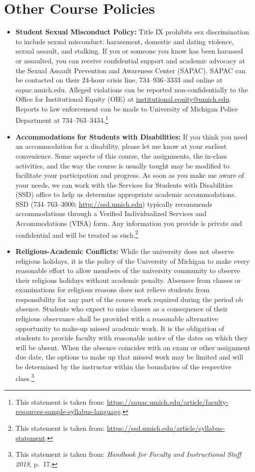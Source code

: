 \documentclass[11pt]{article}
\begin{document}
\section{Other Course Policies}
\begin{itemize}
 \item \textbf{Student Sexual Misconduct Policy:}
       Title IX prohibits sex discrimination to include sexual misconduct: harassment, domestic and dating violence, sexual assault, and stalking. If you or someone you know has been harassed or assaulted, you can receive confidential support and academic advocacy at the Sexual Assault Prevention and Awareness Center (SAPAC). SAPAC can be contacted on their 24-hour crisis line, 734--936--3333 and online at sapac.umich.edu. Alleged violations can be reported non-confidentially to the Office for Institutional Equity (OIE) at \href{mailto:institutional.equity@umich.edu}{institutional.equity@umich.edu}. Reports to law enforcement can be made to University of Michigan Police Department at 734--763--3434.\footnote{This statement is taken from: \url{https://sapac.umich.edu/article/faculty-resources-sample-syllabus-language}.}

 \item \textbf{Accommodations for Students with Disabilities:}
       If you think you need an accommodation for a disability, please let me know at your earliest convenience. Some aspects of this course, the assignments, the in-class activities, and the way the course is usually taught may be modified to facilitate your participation and progress. As soon as you make me aware of your needs, we can work with the Services for Students with Disabilities (SSD) office to help us determine appropriate academic accommodations. SSD (734--763--3000; \url{http://ssd.umich.edu}) typically recommends accommodations through a Verified Individualized Services and Accommodations (VISA) form. Any information you provide is private and confidential and will be treated as such.\footnote{This statement is taken from: \url{https://ssd.umich.edu/article/syllabus-statement}.}

 \item \textbf{Religious-Academic Conflicts:}
       While the university does not observe religious holidays, it is the policy of the University of Michigan to make every reasonable effort to allow members of the university community to observe their religious holidays without academic penalty.
       Absensce from classes or examinations for religious reasons does not relieve students from responsibility for any part of the course work required during the period ob absence.
       Students who expect to miss classes as a consequence of their religious observance shall be provided with a reasonable alternative opportunity to make-up missed academic work.
       It is the obligation of students to provide faculty with reasonable notice of the dates on which they will be absent.
       When the absence coincides with an exam or other assignment due date, the options to make up that missed work may be limited and will be determined by the instructor within the boundaries of the respective class.\footnote{This statement is taken from: \textit{Handbook for Faculty and Instructional Staff 2018}, p.~17.}


\end{itemize}
\end{document}

